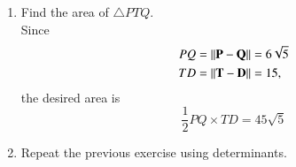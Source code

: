\documentclass[journal,12pt,twocolumn]{IEEEtran}
\renewcommand\thesection{\arabic{section}}
\begin{document}
\begin{enumerate}[label=\thesection.\arabic*
,ref=\thesection.\theenumi]
\begin{align}
4 \lambda^2 - 144 &= 36
\\
\implies
\lambda &= \pm 3\sqrt{5}
\end{align}
%
Substituting in \eqref{eq:pq_slope},
\begin{align}
\vec{P} &= \vec{D}+ 3\sqrt{5} \vec{m} = 3 \myvec{ \sqrt{5} \\ -4}
\\
\vec{Q} &= \vec{D}- 3\sqrt{5} \vec{m} = -3 \myvec{ \sqrt{5} \\ 4}
\end{align}
%
\item Find the area of $\triangle PTQ$.
\\
\solution Since
\begin{align}
PQ &= \lVert\mathbf{P}-\mathbf{Q}\rVert = 6\sqrt{5}
\\
TD &= \lVert\mathbf{T}-\mathbf{D}\rVert = 15,
\end{align}
the desired area is
\begin{equation}
\frac{1}{2}PQ \times TD = 45 \sqrt{5}
\end{equation}
\item Repeat the previous exercise using determinants.
\end{enumerate}
\end{document}
